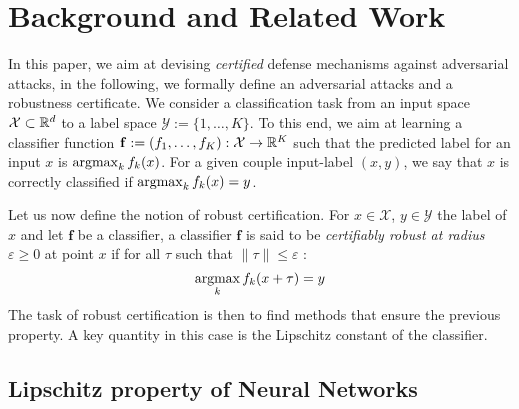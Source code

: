
\section{Background and Related Work}
\label{section:background_rw}

In this paper, we aim at devising {\em certified} defense mechanisms against adversarial attacks, in the following, we formally define an adversarial attacks and a robustness certificate.
We consider a classification task from an input space $\mathcal{X}\subset\mathbb{R}^d$ to a label space $\mathcal{Y}:=\{1,\dots,K\}$.
To this end, we aim at learning a classifier function $\mathbf{f}:=(f_1,\dots,f_K):\mathcal{X}\to \mathbb{R}^K$ such that the predicted label for an input $x$ is $\operatorname*{argmax}_k f_k(x)$.
For a given couple input-label $(x,y)$, we say that $x$ is correctly classified if $\operatorname*{argmax}_k f_k(x)=y$.


Let us now define the notion of  robust certification. For $x \in \mathcal{X}$, $y \in \mathcal{Y}$ the label of $x$ and let $\mathbf{f}$ be a classifier, a classifier $\mathbf{f}$ is said to be \emph{certifiably robust at radius $\varepsilon\geq 0$} at point $x$ if for all $\tau$ such that ${\lVert\tau\rVert \leq \varepsilon}$ :
\begin{equation*}
  \operatorname*{argmax}_k f_k(x+\tau) = y
\end{equation*}
The task of robust certification is then to find methods that ensure the previous property. A key quantity in this case is the Lipschitz constant of the classifier.



\subsection{Lipschitz property of Neural Networks}

